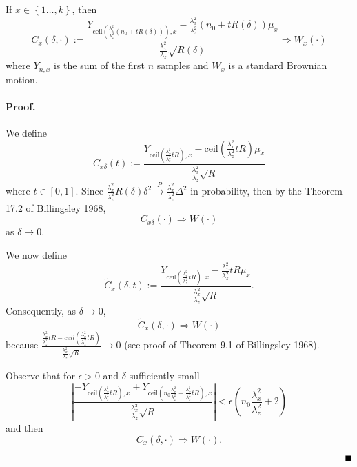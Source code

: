 \documentclass[11pt,english]{article}
\begin{document}
If $x\in\left\{ 1\ldots,k\right\} $, then
\[
C_{x}\left(\delta,\cdot\right):=\frac{Y_{\mbox{ceil}\left(\frac{\lambda_{x}^{2}}{\lambda_{z}^{2}}\left(n_{0}+tR\left(\delta\right)\right)\right),x}-\frac{\lambda_{x}^{2}}{\lambda_{z}^{2}}\left(n_{0}+tR\left(\delta\right)\right)\mu_{x}}{\frac{\lambda_{x}^{2}}{\lambda_{z}}\sqrt{R\left(\delta\right)}}\Rightarrow W_{x}\left(\cdot\right)
\]
where $Y_{n,x}$ is the sum of the first $n$ samples and $W_{x}$
is a standard Brownian motion.


\paragraph*{Proof.}

We define 
\[
C_{x\delta}\left(t\right):=\frac{Y_{\mbox{ceil}\left(\frac{\lambda_{x}^{2}}{\lambda_{z}^{2}}tR\right),x}-\mbox{ceil}\left(\frac{\lambda_{x}^{2}}{\lambda_{z}^{2}}tR\right)\mu_{x}}{\frac{\lambda_{x}^{2}}{\lambda_{z}}\sqrt{R}}
\]
where $t\in\left[0,1\right]$. Since $ $$\frac{\lambda_{x}^{2}}{\lambda_{z}^{2}}R\left(\delta\right)\delta^{2}\overset{P}{\rightarrow}\frac{\lambda_{x}^{2}}{\lambda_{z}^{2}}\Delta^{2}$
in probability, then by the Theorem 17.2 of Billingsley 1968, 
\[
C_{x\delta}\left(\cdot\right)\Rightarrow W\left(\cdot\right)
\]
as $\delta\rightarrow0$.

We now define 
\[
\tilde{C}_{x}\left(\delta,t\right):=\frac{Y_{\mbox{ceil}\left(\frac{\lambda_{x}^{2}}{\lambda_{z}^{2}}tR\right),x}-\frac{\lambda_{x}^{2}}{\lambda_{z}^{2}}tR\mu_{x}}{\frac{\lambda_{x}^{2}}{\lambda_{z}}\sqrt{R}}.
\]
Consequently, as $\delta\rightarrow0$,
\[
\tilde{C}_{x}\left(\delta,\cdot\right)\Rightarrow W\left(\cdot\right)
\]
because $\frac{\frac{\lambda_{x}^{2}}{\lambda_{z}^{2}}tR-ceil\left(\frac{\lambda_{x}^{2}}{\lambda_{z}^{2}}tR\right)}{\frac{\lambda_{x}^{2}}{\lambda_{z}}\sqrt{R}}\rightarrow0$
(see proof of Theorem 9.1 of Billingsley 1968). 

Observe that for $\epsilon>0$ and $\delta$ sufficiently small
\[
\left|\frac{-Y_{\mbox{ceil}\left(\frac{\lambda_{x}^{2}}{\lambda_{z}^{2}}tR\right),x}+Y_{\mbox{ceil}\left(n_{0}\frac{\lambda_{x}^{2}}{\lambda_{z}^{2}}+\frac{\lambda_{x}^{2}}{\lambda_{z}^{2}}tR\right),x}}{\frac{\lambda_{x}^{2}}{\lambda_{z}}\sqrt{R}}\right|<\epsilon\left(n_{0}\frac{\lambda_{x}^{2}}{\lambda_{z}^{2}}+2\right)
\]
and then
\[
C_{x}\left(\delta,\cdot\right)\Rightarrow W\left(\cdot\right).
\]


$\;\;\;\;\;\;\;\;\;\;\;\;\;\;\;\;\;\;\;\;\;\;\;\;\;\;\;\;\;\;\;\;\;\;\;\;\;\;\;\;\;\;\;\;\;\;\;\;\;\;\;\;\;\;\;\;\;\;\;\;\;\;\;\;\;\;\;\;\;\;\;\;\;\;\;\;\;\;\;\;\;\;\;\;\;\;\;\;\;\;\;\;\;\;\;\;\;\;\;\;\;\;\;\;\;\;\;\;\;\;\;\;\;\;\;\;\;\;\;\;\;\;\;\;\;\;\;\;\;\;\;\;\;\;\;\;\;\;\;\text{\ensuremath{\blacksquare}}$
\end{document}
